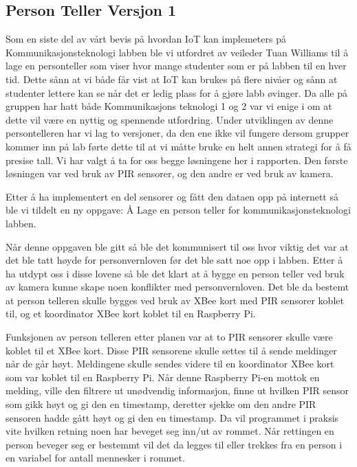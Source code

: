 \documentclass{article}
\begin{document}
\subsection{Person Teller Versjon 1}
Som en siste del av vårt bevis på hvordan IoT kan implemeters på Kommunikasjonsteknologi labben ble vi utfordret av veileder Tuan Williams til å lage en personteller som viser hvor mange studenter som er på labben til en hver tid. Dette sånn at vi både får vist at IoT kan brukes på flere nivåer og sånn at studenter lettere kan se når det er ledig plass for å gjøre labb øvinger. Da alle på gruppen har hatt både Kommunikasjons teknologi 1 og 2 var vi enige i om at dette vil være en nyttig og spennende utfordring. Under utviklingen av denne persontelleren har vi lag to versjoner, da den ene ikke vil fungere dersom grupper kommer inn på lab førte dette til at vi måtte bruke en helt annen strategi for å få presise tall. Vi har valgt å ta for oss begge løsningene her i rapporten. Den første løsningen var ved bruk av PIR sensorer, og den andre er ved bruk av kamera. 

Etter å ha implementert en del sensorer og fått den dataen opp på internett så ble vi tildelt en ny oppgave: Å Lage en person teller for kommunikasjonsteknologi labben. 

Når denne oppgaven ble gitt så ble det kommunisert til oss hvor viktig det var at det ble tatt høyde for personvernloven før det ble satt noe opp i labben. Etter å ha utdypt oss i disse lovene så ble det klart at å bygge en person teller ved bruk av kamera kunne skape noen konflikter med personvernloven. Det ble da bestemt at person telleren skulle bygges ved bruk av XBee kort med PIR sensorer koblet til,  og et koordinator XBee kort koblet til en Raspberry Pi.

Funksjonen av person telleren etter planen var at to PIR sensorer skulle være koblet til et XBee kort. Disse PIR sensorene skulle settes til å sende meldinger når de går høyt. Meldingene skulle sendes videre til en koordinator XBee kort som var koblet til en Raspberry Pi. Når denne Raspberry Pi-en mottok en melding, ville den filtrere ut unødvendig informasjon, finne ut hvilken PIR sensor som gikk høyt og gi den en timestamp, deretter sjekke om den andre PIR sensoren hadde gått høyt og gi den en timestamp. Da vil programmet i praksis vite hvilken retning noen har beveget seg inn/ut av rommet. Når rettingen en person beveger seg er bestemmt vil det da legges til eller trekkes fra en person i en variabel for antall mennesker i rommet.
\end{document}
